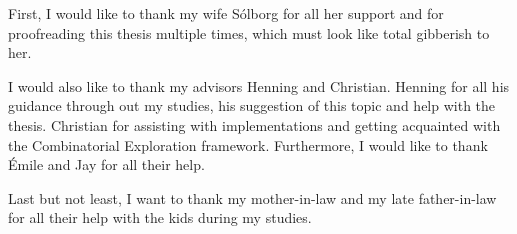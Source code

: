 First, I would like to thank my wife Sólborg for all her support and for proofreading this thesis multiple times, which must look like total gibberish to her.

I would also like to thank my advisors Henning and Christian. Henning for all his guidance through out my studies, his suggestion of this topic and help with the thesis. Christian for assisting with implementations and getting acquainted with the Combinatorial Exploration framework. Furthermore, I would like to thank Émile and Jay for all their help.

Last but not least, I want to thank my mother-in-law and my late father-in-law for all their help with the kids during my studies.
